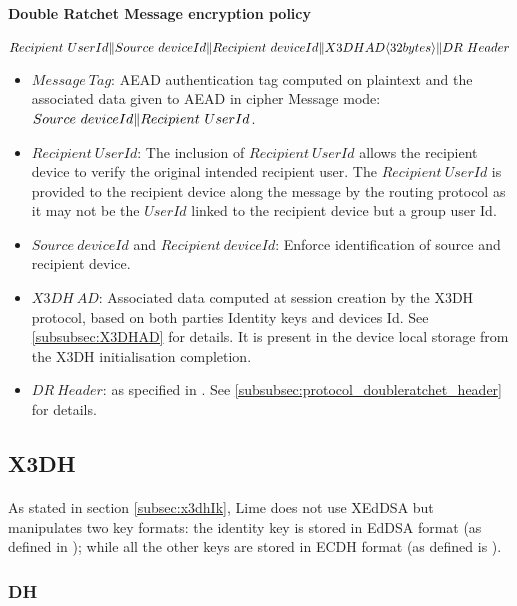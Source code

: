 \documentclass[a4paper,11pt]{article}
\begin{document}
     \paragraph*{Double Ratchet Message encryption policy}
     \begin{algorithmic}
          \State $Recipient\ UserId \Arrowvert Source\ deviceId \Arrowvert Recipient\ deviceId \Arrowvert X3DH AD\langle 32bytes\rangle \Arrowvert DR\ Header$
     \end{algorithmic}

     \begin{itemize}
      \item $Message\ Tag$: AEAD authentication tag computed on plaintext and the associated data given to AEAD in cipher Message mode: $Source\ deviceId\Arrowvert Recipient\ UserId$.
      \item $Recipient\ UserId$: The inclusion of $Recipient\ UserId$ allows the recipient device to verify the original intended recipient user. The $Recipient\ UserId$ is provided to the recipient device along the message by the routing protocol as it may not be the $UserId$ linked to the recipient device but a group user Id.
      \item $Source\ deviceId$ and $Recipient\ deviceId$: Enforce identification of source and recipient device.
      \item $X3DH\ AD$: Associated data computed at session creation by the X3DH protocol, based on both parties Identity keys and devices Id. See \ref{subsubsec:X3DHAD} for details. It is present in the device local storage from the X3DH initialisation completion.
      \item $DR\ Header$: as specified in \cite[section 3.4]{doubleRatchet}. See \ref{subsubsec:protocol_doubleratchet_header} for details.
     \end{itemize}


  \subsection{X3DH}
    \paragraph*{}As stated in section \ref{subsec:x3dhIk}, Lime does not use XEdDSA but manipulates two key formats: the identity key is stored in EdDSA format (as defined in \cite{rfc8032}); while all the other keys are stored in ECDH format (as defined is \cite{rfc7748}).
    \subsubsection{DH}
\end{document}
